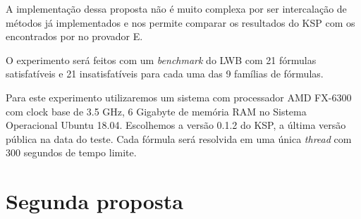 A implementação dessa proposta não é muito complexa por ser intercalação de métodos já implementados e nos permite comparar os resultados do KSP com os encontrados por \cite{stephan} no provador E.

O experimento será feitos com um \textit{benchmark} do LWB\cite{lwb} com 21 fórmulas satisfatíveis e 21 insatisfatíveis para cada uma das 9 famílias de fórmulas.

Para este experimento utilizaremos um sistema com processador AMD FX-6300 com clock base de 3.5 GHz, 6 Gigabyte de memória RAM no Sistema Operacional Ubuntu 18.04. Escolhemos a versão 0.1.2 do KSP, a última versão pública na data do teste. Cada fórmula será resolvida em uma única \textit{thread} com 300 segundos de tempo limite.

\section{Segunda proposta}





